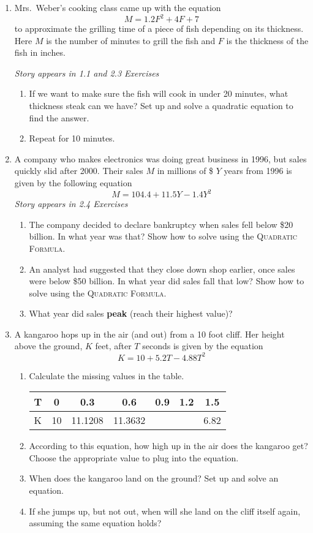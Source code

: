 \begin{enumerate}
\item Mrs.\ Weber's cooking class came up with the equation $$M = 1.2F^2+4F+7$$ to approximate the grilling time of a piece of fish depending on its thickness.  Here $M$ is the number of minutes to grill the fish and $F$ is the thickness of the fish in inches.  

\hfill \emph{Story appears in 1.1 and 2.3 Exercises}
\begin{enumerate}
\item If we want to make sure the fish will cook in under 20 minutes, what thickness steak can we have? Set up and solve a quadratic equation to find the answer.
\item Repeat for 10 minutes. 
\end{enumerate}

\item A company who makes electronics was doing great business in 1996, but sales quickly slid after 2000.  Their sales $M$ in millions of \$ $Y$ years from 1996 is given by the following equation $$M = 104.4+11.5Y-1.4Y^2$$
\hfill \emph{Story appears in 2.4 Exercises}
\begin{enumerate}
\item The company decided to declare bankruptcy when sales fell below \$20 billion.  In what year was that?    Show how to solve using the \textsc{Quadratic Formula.}
\item An analyst had suggested that they close down shop earlier, once sales were below \$50 billion.  In what year did sales fall that low? Show how to solve using the \textsc{Quadratic Formula.}
\item What year did sales \textbf{peak} (reach their highest value)?  
\end{enumerate} 

\item A kangaroo hops up in the air (and out) from a 10 foot cliff.  Her height above the ground, $K$ feet, after $T$ seconds is given by the equation $$K = 10 + 5.2T - 4.88T^2$$ 
\begin{enumerate}
\item Calculate the missing values in the table. 
\begin{center}
\begin{tabular} {|l|c|c|c|c|c|c|} \hline
T & 0 & 0.3 & 0.6 & 0.9 & 1.2 & 1.5 \\ \hline
K& 10 & 11.1208 & 11.3632  &  \hspace{.4in}    &  \hspace{.4in}   &6.82  \\ \hline
\end{tabular}
\end{center}
\item According to this equation, how high up in the air does the kangaroo get? 
Choose the appropriate value to plug into the equation.
\item When does the kangaroo land on the ground? 
Set up and solve an equation.
\item If she jumps up, but not out, when will she land on the cliff itself again, assuming the same equation holds?
\end{enumerate}

\end{enumerate}


